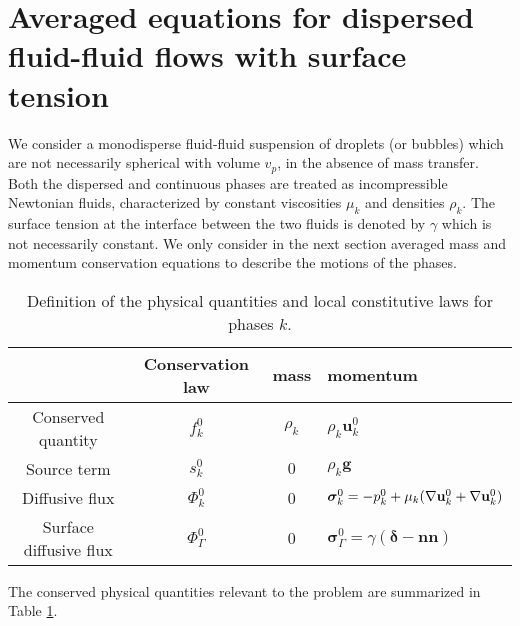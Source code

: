 \section{Averaged equations for dispersed fluid-fluid flows with surface tension}%
\label{sec:averaged_surface}


We consider a monodisperse fluid-fluid suspension of droplets (or bubbles) which are not necessarily spherical with volume \( v_p \), in the absence of mass transfer. 
Both the dispersed and continuous phases are treated as incompressible Newtonian fluids, characterized by constant viscosities \( \mu_k \) and densities \( \rho_k \). 
The surface tension at the interface between the two fluids is denoted by \( \gamma \) which is not necessarily constant.%
We only consider in the next section averaged mass and momentum conservation equations to describe the motions of the phases. 
\begin{table}
    \centering
    \begin{tabular}{|c|ccl|}\hline
    & Conservation law & mass & momentum \\ \hline
    Conserved quantity & $f_k^0$  & $\rho_k$ & $\rho_k \textbf{u}_k^0$ \\
    Source term & $s_k^0$  & $0$ & $\rho_k \textbf{g}$ \\
    Diffusive flux & $\Phi_k^0$ & 0 & $\bm\sigma_k^0 = -p_k^0 + \mu_k (\mathbf{\nabla} \textbf{u}_k^0 + \mathbf{\nabla} \textbf{u}_k^0)$ \\
    Surface diffusive flux & $\Phi_\Gamma^0$ & 0 & $\bm\sigma_\Gamma^0 = \gamma (\bm\delta - \textbf{nn})$ \\\hline
    \end{tabular}

    \caption{Definition of the physical quantities and local constitutive laws for phases $k$.}
    \label{tab:qte_Newtonian}
\end{table}
The conserved physical quantities  relevant to the problem are summarized in Table \ref{tab:qte_Newtonian}.


